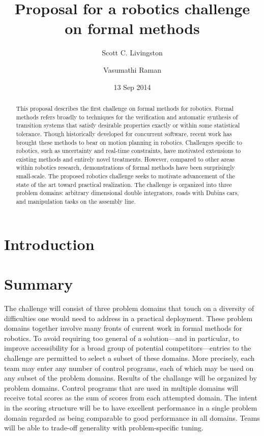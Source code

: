 \documentclass[12pt]{amsart}
\begin{document}
\title{Proposal for a robotics challenge on formal methods}
\author{Scott C. Livingston \and Vasumathi Raman}
\date{13 Sep 2014}
\begin{abstract}
This proposal describes the first challenge on formal methods for robotics.
Formal methods refers broadly to techniques for the verification and automatic
synthesis of transition systems that satisfy desirable properties exactly or
within some statistical tolerance.  Though historically developed for concurrent
software, recent work has brought these methods to bear on motion planning in
robotics.  Challenges specific to robotics, such as uncertainty and real-time
constraints, have motivated extensions to existing methods and entirely novel
treatments.  However, compared to other areas within robotics research,
demonstrations of formal methods have been surprisingly small-scale.  The
proposed robotics challenge seeks to motivate advancement of the state of the
art toward practical realization.  The challenge is organized into three problem
domains: arbitrary dimensional double integrators, roads with Dubins cars, and
manipulation tasks on the assembly line.
\end{abstract}
\maketitle


\section{Introduction}



\section{Summary}

The challenge will consist of three problem domains that touch on a diversity of
difficulties one would need to address in a practical deployment.  These problem
domains together involve many fronts of current work in formal methods for
robotics.  To avoid requiring too general of a solution---and in particular, to
improve accessibility for a broad group of potential competitors---entries to
the challenge are permitted to select a subset of these domains.  More
precisely, each team may enter any number of control programs, each of which may
be used on any subset of the problem domains.  Results of the challange will be
organized by problem domains.  Control programs that are used in multiple
domains will receive total scores as the sum of scores from each attempted
domain.  The intent in the scoring structure will be to have excellent
performance in a single problem domain regarded as being comparable to good
performance in all domains.  Teams will be able to trade-off generality with
problem-specific tuning.
\end{document}
